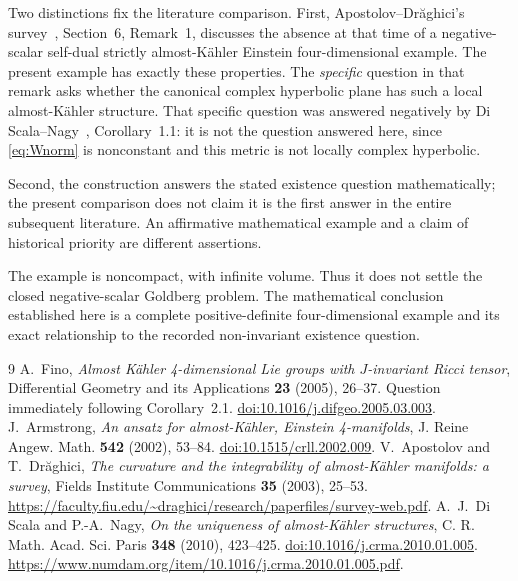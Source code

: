 \documentclass[11pt]{article}
\begin{document}
Two distinctions fix the literature comparison. First,
Apostolov--Dr\u aghici's survey~\cite{AD}, Section~6, Remark~1, discusses
the absence at that time of a negative-scalar self-dual strictly
almost-K\"ahler Einstein four-dimensional example. The present example
has exactly these properties. The \emph{specific} question in that
remark asks whether the canonical complex hyperbolic plane has such
a local almost-K\"ahler structure. That specific question was answered
negatively by Di Scala--Nagy~\cite{DSN}, Corollary~1.1: it is not the
question answered here, since \eqref{eq:Wnorm} is nonconstant and this
metric is not locally complex hyperbolic.

Second, the construction answers the stated existence question
mathematically; the present comparison does not claim it is the first
answer in the entire subsequent literature. An affirmative mathematical
example and a claim of historical priority are different assertions.

The example is noncompact, with infinite volume. Thus it does not
settle the closed negative-scalar Goldberg problem. The mathematical
conclusion established here is a complete positive-definite
four-dimensional example and its exact relationship to the recorded
non-invariant existence question.

\begin{thebibliography}{9}
 A.~Fino,
\emph{Almost K\"ahler 4-dimensional Lie groups with $J$-invariant Ricci tensor},
Differential Geometry and its Applications \textbf{23} (2005), 26--37.
Question immediately following Corollary~2.1.
\href{https://doi.org/10.1016/j.difgeo.2005.03.003}{doi:10.1016/j.difgeo.2005.03.003}.
 J.~Armstrong,
\emph{An ansatz for almost-K\"ahler, Einstein 4-manifolds},
J. Reine Angew. Math. \textbf{542} (2002), 53--84.
\href{https://doi.org/10.1515/crll.2002.009}{doi:10.1515/crll.2002.009}.
 V.~Apostolov and T.~Dr\u aghici,
\emph{The curvature and the integrability of almost-K\"ahler manifolds:
a survey}, Fields Institute Communications \textbf{35} (2003), 25--53.
\url{https://faculty.fiu.edu/~draghici/research/paperfiles/survey-web.pdf}.
 A.~J.~Di Scala and P.-A.~Nagy,
\emph{On the uniqueness of almost-K\"ahler structures},
C. R. Math. Acad. Sci. Paris \textbf{348} (2010), 423--425.
\href{https://doi.org/10.1016/j.crma.2010.01.005}{doi:10.1016/j.crma.2010.01.005}.
\url{https://www.numdam.org/item/10.1016/j.crma.2010.01.005.pdf}.
\end{thebibliography}
\end{document}
